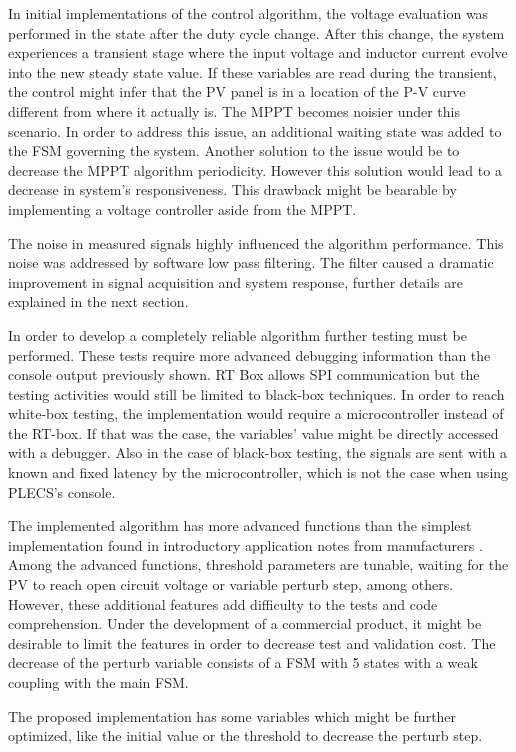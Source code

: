 In initial implementations of the control algorithm, the voltage evaluation was performed in the state after the duty cycle change. 
After this change, the system experiences a transient stage where the input voltage and inductor current evolve into the new steady state value. If these variables are read during the transient, the control might infer that the PV panel is in a location of the P-V curve different from where it actually is. 
The MPPT becomes noisier under this scenario. In order to address this issue, an additional waiting state was added to the FSM governing the system. 
Another solution to the issue would be to decrease the MPPT algorithm periodicity. However this solution would lead to a decrease in system's responsiveness. This drawback might be bearable by implementing a voltage controller aside from the MPPT.  

The noise in measured signals highly influenced the algorithm performance. This noise was addressed by software low pass filtering. The filter caused a dramatic improvement in signal acquisition and system response, further details are explained in the next section.

In order to develop a completely reliable algorithm further testing must be performed. These tests require more advanced debugging information than the console output previously shown. RT Box allows SPI communication but the testing activities would still be limited to black-box techniques. In order to reach white-box testing, the implementation would require a microcontroller instead of the RT-box. If that was the case, the variables' value might be directly accessed with a debugger. Also in the case of black-box testing, the signals are sent with a known and fixed latency by the microcontroller, which is not the case when using PLECS's console.

The implemented algorithm has more advanced functions than the simplest implementation found in introductory application notes from manufacturers \cite{AN1521_MC}. 
Among the advanced functions, threshold parameters are tunable, waiting for the PV to reach open circuit voltage or variable perturb step, among others. However, these additional features add difficulty to the tests and code comprehension. Under the development of a commercial product, it might be desirable to limit the features in order to decrease test and validation cost. The decrease of the perturb variable consists of a FSM with 5 states with a weak coupling with the main FSM.

The proposed implementation has some variables which might be further optimized, like the initial value or the threshold to decrease the perturb step. 



